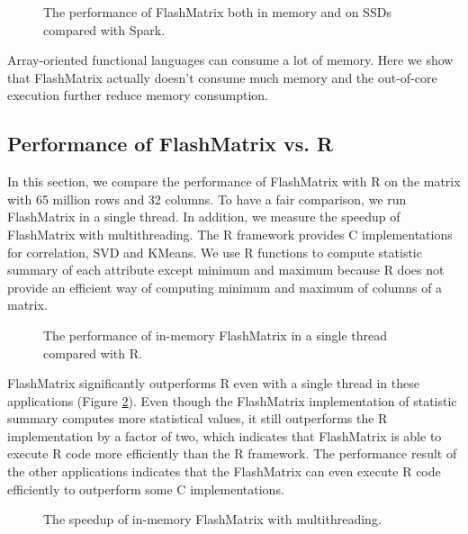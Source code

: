 \begin{figure}
	\begin{center}
		\footnotesize
		
		\caption{The performance of FlashMatrix both in memory and on SSDs
		compared with Spark.}
		\label{perf:fm}
	\end{center}
\end{figure}

Array-oriented functional languages can consume a lot of memory. Here we show
that FlashMatrix actually doesn't consume much memory and the out-of-core
execution further reduce memory consumption.

\subsection{Performance of FlashMatrix vs. R}
In this section, we compare the performance of FlashMatrix with R on the matrix
with 65 million rows and 32 columns. To have
a fair comparison, we run FlashMatrix in a single thread. In addition, we
measure the speedup of FlashMatrix with multithreading. The R framework
provides C implementations for correlation, SVD and KMeans. We use R functions
to compute statistic summary of each attribute except minimum and maximum
because R does not provide an efficient way of computing minimum and maximum
of columns of a matrix.


\begin{figure}
	\begin{center}
		\footnotesize
		
		\caption{The performance of in-memory FlashMatrix in a single thread
		compared with R.}
		\label{fig:fmR}
	\end{center}
\end{figure}

FlashMatrix significantly outperforms R even with a single thread in these
applications (Figure \ref{fig:fmR}). Even though the FlashMatrix implementation
of statistic summary computes more statistical values, it still outperforms
the R implementation by a factor of two, which indicates that FlashMatrix is
able to execute R code more efficiently than the R framework. The performance
result of the other applications indicates that the FlashMatrix can even
execute R code efficiently to outperform some C implementations.

\begin{figure}
	\begin{center}
		\footnotesize
		
		\caption{The speedup of in-memory FlashMatrix with multithreading.}
		\label{fig:speedup}
	\end{center}
\end{figure}

